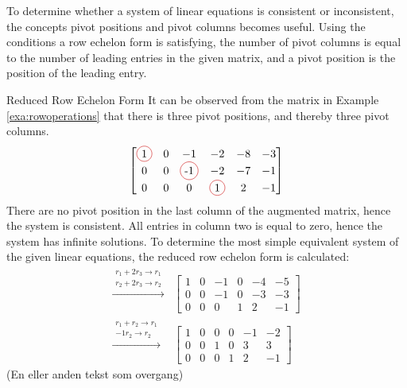 To determine whether a system of linear equations is consistent or inconsistent, the concepts pivot positions and pivot columns
becomes useful. Using the conditions a row echelon form is satisfying, the number of pivot columns is equal to the number of leading entries in the given matrix, and a pivot position is the position of the leading entry.  
\begin{example}{Reduced Row Echelon Form}
It can be observed from the matrix in Example \ref{exa:rowoperations} that there is three pivot positions, and thereby three pivot columns.
\begin{align}
     \begin{bmatrix}
  	 \circled{1} & 0 & -1 &-2 & -8 & -3 \\
 	 0 & 0 & \circled{-1} & -2 & -7 & -1 \\
	 0 &0 & 0 & \circled{1} & 2 & -1
       \end{bmatrix}
\label{examplepivot}
\end{align}
There are no pivot position in the last column of the augmented matrix, hence the system is consistent. All entries in column two is equal to zero, hence the system has infinite solutions. To determine the most simple equivalent system of the given linear equations, the reduced row echelon form is calculated:
\begin{align*}
  \xrightarrow{\substack{r_1+2r_3\rightarrow r_1\\r_2+2r_3\rightarrow r_2}}
    &\begin{bmatrix}
  	    1 & 0 & -1 &0 & -4 & -5 \\
 	    0 & 0 & -1 & 0 & -3 & -3 \\
	    0 &0 & 0 & 1 & 2 & -1
     \end{bmatrix}\\
  \xrightarrow{\substack{r_1+r_2\rightarrow r_1\\-1r_2\rightarrow r_2}}
  &\begin{bmatrix}
        1 & 0 & 0 &0 & -1 & -2 \\
 	    0 & 0 & 1 & 0 & 3 & 3 \\
	    0 &0 & 0 & 1 & 2 & -1
     \end{bmatrix}
    \end{align*}
(En eller anden tekst som overgang)


\end{example}
